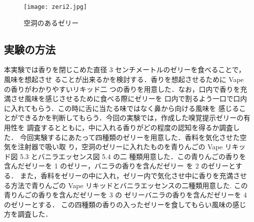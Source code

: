  \begin{figure}[h]
    \centering
    \texttt{[image: zeri2.jpg]}
    \caption{空洞のあるゼリー}
    \label{zeri}
  \end{figure}


\subsection{実験の方法}
本実験では香りを閉じこめた直径 3 センチメートルのゼリーを食べることで，風味を想起させ
ることが出来るかを検討する．香りを想起させるために Vape の香りがわかりやすいリキッド二
つの香りを用意した．なお，口内で香りを充満させ風味を感じさせるために食べる際にゼリーを
口内で割るよう一口で口内に入れてもらう．この時に舌に当たる味ではなく鼻から向ける風味を
感じることができるかを判断してもらう．今回の実験では，作成した嗅覚提示ゼリーの有用性を
調査するとともに，中に入れる香りがどの程度の認知を得るか調査した．
今回実験するにあたって四種類のゼリーを用意した．香料を気化させた空気を注射器で吸い取
り，空洞のゼリーに入れたものを青りんごの Vape リキッド図 5.3 とバニラエッセンス図 5.4 の二
種類用意した．この青りんごの香りを含んだゼリーを 1 のゼリー，バニラの香りを含んだゼリー
を 2 のゼリーとする．
また，香料をゼリーの中に入れ，ゼリー内で気化させ中に香りを充満させる方法で青りんごの
Vape リキッドとバニラエッセンスの二種類用意した. この青りんごの香りを含んだゼリーを 3 の
ゼリーバニラの香りを含んだゼリーを 4 のゼリーとする．
この四種類の香りの入ったゼリーを食してもらい風味の感じ方を調査した．
